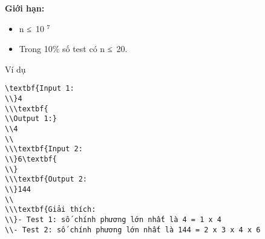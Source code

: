 \textbf{    Giới hạn:
}
\begin{itemize}
	\item     n ≤ 10    $^     7    $
	\item     Trong 10\% số test có n ≤ 20.   
\end{itemize}
Ví dụ
\begin{verbatim}
\textbf{Input 1:
\\}4
\\\textbf{
\\Output 1:}
\\4
\\
\\\textbf{Input 2:
\\}6\textbf{
\\}
\\\textbf{Output 2:
\\}144
\\
\\\textbf{Giải thích:
\\}- Test 1: số chính phương lớn nhất là 4 = 1 x 4
\\- Test 2: số chính phương lớn nhất là 144 = 2 x 3 x 4 x 6\end{verbatim}